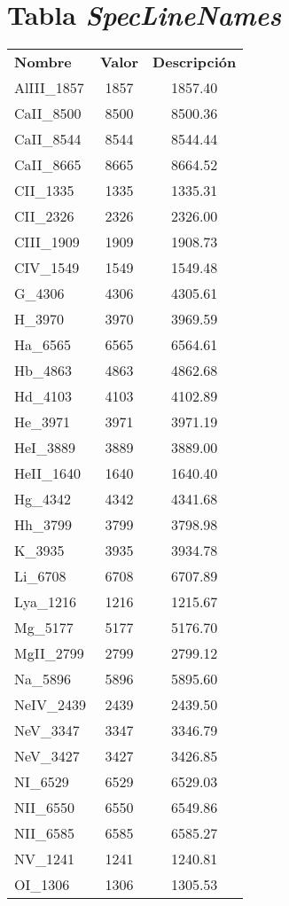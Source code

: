 \documentclass[upright, contnum]{umemoria}
\begin{document}
\appendix
\chapter{Tabla \textit{SpecLineNames}}
\begin{longtable}{l c c}
\label{tab:spec_line_names}
\textbf{Nombre} & \textbf{Valor} & \textbf{Descripción} \\
AlIII\_1857 & 1857 & 1857.40 \\
CaII\_8500 & 8500 & 8500.36 \\
CaII\_8544 & 8544 & 8544.44 \\
CaII\_8665 & 8665 & 8664.52 \\
CII\_1335 & 1335 & 1335.31 \\
CII\_2326 & 2326 & 2326.00 \\
CIII\_1909 & 1909 & 1908.73 \\
CIV\_1549 & 1549 & 1549.48 \\
G\_4306 & 4306 & 4305.61 \\
H\_3970 & 3970 & 3969.59 \\
Ha\_6565 & 6565 & 6564.61 \\
Hb\_4863 & 4863 & 4862.68 \\
Hd\_4103 & 4103 & 4102.89 \\
He\_3971 & 3971 & 3971.19 \\
HeI\_3889 & 3889 & 3889.00 \\
HeII\_1640 & 1640 & 1640.40 \\
Hg\_4342 & 4342 & 4341.68 \\
Hh\_3799 & 3799 & 3798.98 \\
K\_3935 & 3935 & 3934.78 \\
Li\_6708 & 6708 & 6707.89 \\
Lya\_1216 & 1216 & 1215.67 \\
Mg\_5177 & 5177 & 5176.70 \\
MgII\_2799 & 2799 & 2799.12 \\
Na\_5896 & 5896 & 5895.60 \\
NeIV\_2439 & 2439 & 2439.50 \\
NeV\_3347 & 3347 & 3346.79 \\
NeV\_3427 & 3427 & 3426.85 \\
NI\_6529 & 6529 & 6529.03 \\
NII\_6550 & 6550 & 6549.86 \\
NII\_6585 & 6585 & 6585.27 \\
NV\_1241 & 1241 & 1240.81 \\
OI\_1306 & 1306 & 1305.53 \\

\end{longtable}
\end{document}
